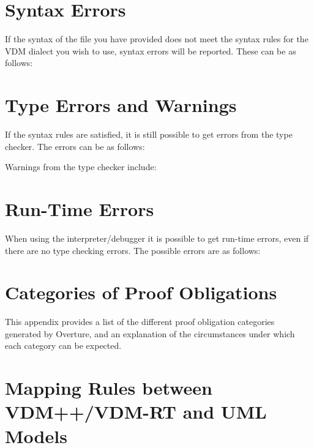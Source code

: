 \documentclass{overturerepchap}
\begin{document}


\newpage
\chapter{Syntax Errors}\label{app:synerr}

If the syntax of the file you have provided does not meet the
syntax rules for the VDM dialect you wish to use, syntax errors will be
reported. These can be as follows:



\newpage
\chapter{Type Errors and Warnings}\label{app:typeerr}

If the syntax rules are satisfied, it is still possible to get
errors from the type checker. The errors can be as
follows:



Warnings from the type checker include:



\newpage
\chapter{Run-Time Errors}\label{app:runtimeerr}

When using the interpreter/debugger it is possible to get run-time
errors, even if there are no type checking errors. The possible errors
are as follows:



\newpage
\chapter{Categories of Proof Obligations}\label{app:POcategories}

This appendix provides a list of the different proof obligation
categories generated by Overture, and an explanation of the
circumstances under which each category can be expected.




\newpage
\chapter{Mapping Rules between VDM++/VDM-RT and UML Models} \label{chap:umlrules}
\end{document}
